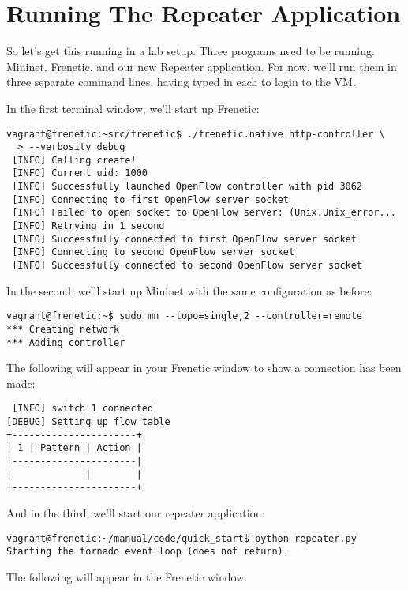 \section{Running The Repeater Application}

So let's get this running in a lab setup.  
Three programs need to be running:  Mininet, Frenetic, and our new Repeater application.  
For now, we'll run them in three separate command lines, having typed  in each
to login to the VM.

In the first terminal window, we'll start up Frenetic:

\begin{verbatim}
vagrant@frenetic:~src/frenetic$ ./frenetic.native http-controller \
  > --verbosity debug
 [INFO] Calling create!
 [INFO] Current uid: 1000
 [INFO] Successfully launched OpenFlow controller with pid 3062
 [INFO] Connecting to first OpenFlow server socket
 [INFO] Failed to open socket to OpenFlow server: (Unix.Unix_error...
 [INFO] Retrying in 1 second
 [INFO] Successfully connected to first OpenFlow server socket
 [INFO] Connecting to second OpenFlow server socket
 [INFO] Successfully connected to second OpenFlow server socket 
\end{verbatim}

In the second, we'll start up Mininet with the same configuration as before:

\begin{verbatim}
vagrant@frenetic:~$ sudo mn --topo=single,2 --controller=remote
*** Creating network
*** Adding controller
\end{verbatim}

The following will appear in your Frenetic window to show a connection has been made:

\begin{verbatim}
 [INFO] switch 1 connected
[DEBUG] Setting up flow table
+----------------------+
| 1 | Pattern | Action |
|----------------------|
|             |        |
+----------------------+
\end{verbatim}

And in the third, we'll start our repeater application:

\begin{verbatim}
vagrant@frenetic:~/manual/code/quick_start$ python repeater.py
Starting the tornado event loop (does not return).
\end{verbatim}

The following will appear in the Frenetic window.  

